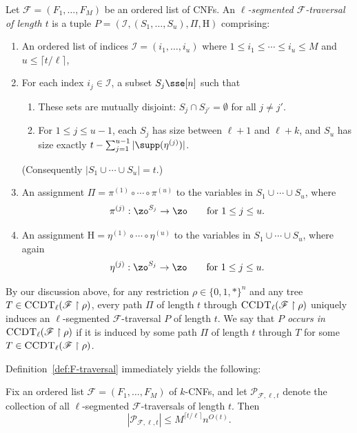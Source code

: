 \documentclass{toc}
\theoremstyle{plain}
\newcommand{\uhr}{\upharpoonright}
\newcommand{\CCDT}{\textsc{CCDT}}
\begin{document}
\begin{definition}
\label{def:F-traversal}
Let $\mathscr{F} = (F_1,\ldots,F_M)$ be an ordered list of CNFs.  An \emph{$\ell$-segmented $\mathscr{F}$-traversal of length $t$} is a tuple $P = (\mathscr{I}, (S_1,\ldots,S_u),\Pi,{\mathrm{H}})$  comprising: 
\begin{enumerate}
\item An ordered list of indices $\mathscr{I} = (i_1, \ldots, i_u)$ where $1\le i_1 \le \cdots \le i_u \le M$ and $u \le \lceil t /\ell \rceil$,
\item For each index $i_j \in \mathscr{I}$,  a subset $S_j \sse [n]$ such that 
\begin{enumerate}
\item These sets are mutually disjoint: $S_j \cap S_{j'} = \emptyset$ for all $j\ne j'$.
\item For $1\le j \le u-1$, each $S_j$ has size between $\ell+1$ and $\ell+k$, and $S_u$ has size exactly $t - \sum_{j=1}^{u-1} |\supp(\eta^{(j)})|$.
\end{enumerate} 
(Consequently $|S_1\cup\cdots\cup S_u| =t$.)
\item An assignment $\Pi = \pi^{(1)}\circ\cdots\circ\pi^{(u)}$ to the variables in $S_1 \cup \cdots \cup S_u$, where 
\[ \pi^{(j)} : \zo^{S_j} \to \zo \qquad \text{for $1\le j\le u$.} \] 
\item An assignment $\mathrm{H} = \eta^{(1)}\circ \cdots\circ\eta^{(u)}$ to the variables in $S_1 \cup \cdots \cup S_u$, where again
\[ \eta^{(j)} : \zo^{S_j} \to \zo \qquad \text{for $1\le j\le u$.} \] 
\end{enumerate} 
\end{definition} 

By our discussion above, for any restriction $\rho \in \{0,1,\ast\}^n$ and any tree $T \in \CCDT_\ell(\mathscr{F} \uhr \rho)$, every path $\Pi$ of length $t$ through $\CCDT_{\ell}(\mathscr{F}\uhr \rho)$ uniquely induces an $\ell$-segmented $\mathscr{F}$-traversal $P$ of length $t$.  We say that \emph{$P$ occurs in $\CCDT_{\ell}(\mathscr{F}\uhr\rho)$} if it is induced by some path $\Pi$ of length $t$ through $T$ for some $T \in \CCDT_\ell(\mathscr{F} \uhr \rho)$.

Definition~\ref{def:F-traversal} immediately yields the following: 

\begin{proposition}
\label{prop:number-of-traversals} 
Fix an ordered list $\mathscr{F} = (F_1,\ldots,F_M)$ of $k$-CNFs, and let $\mathcal{P}_{\mathscr{F},\ell,t}$ denote the collection of all $\ell$-segmented $\mathscr{F}$-traversals of length $t$. Then 
\[ |\mathcal{P}_{\mathscr{F},\ell,t}| \le  M^{\lceil t/\ell \rceil} n^{O(t)}. \] 
\end{proposition} 
\end{document}
